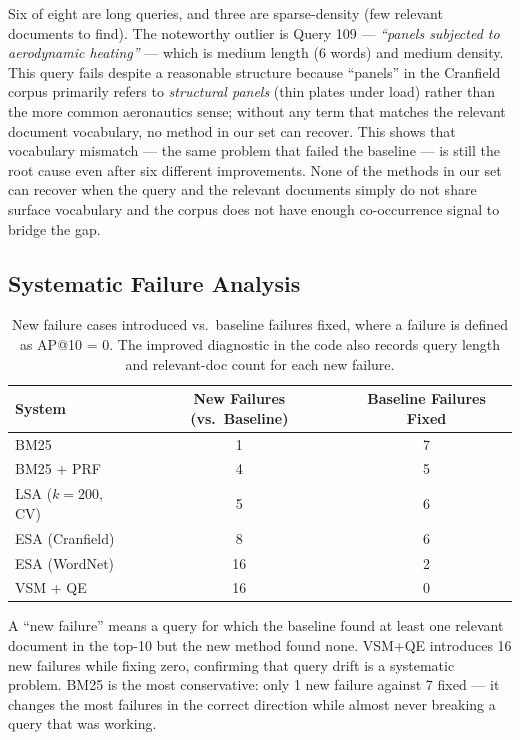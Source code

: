 \documentclass{svproc}
\begin{document}
    Six of eight are long queries, and three are sparse-density (few relevant documents to find). The noteworthy outlier is Query 109 --- \textit{``panels subjected to aerodynamic heating''} --- which is medium length (6 words) and medium density. This query fails despite a reasonable structure because ``panels'' in the Cranfield corpus primarily refers to \emph{structural panels} (thin plates under load) rather than the more common aeronautics sense; without any term that matches the relevant document vocabulary, no method in our set can recover. This shows that vocabulary mismatch --- the same problem that failed the baseline --- is still the root cause even after six different improvements. None of the methods in our set can recover when the query and the relevant documents simply do not share surface vocabulary and the corpus does not have enough co-occurrence signal to bridge the gap.

    \subsection{Systematic Failure Analysis}

    \begin{table}[H]
    \centering
    \renewcommand{\arraystretch}{1.2}
    \begin{tabular}{lcc}
    \toprule
    \textbf{System} & \textbf{New Failures (vs.\ Baseline)} & \textbf{Baseline Failures Fixed} \\
    \midrule
    BM25           & 1  & 7  \\
    BM25 + PRF     & 4  & 5  \\
    LSA ($k{=}200$, CV) & 5  & 6  \\
    ESA (Cranfield)& 8  & 6  \\
    ESA (WordNet)  & 16 & 2  \\
    VSM + QE       & 16 & 0  \\
    \bottomrule
    \end{tabular}
    \caption{New failure cases introduced vs.\ baseline failures fixed, where a failure is defined as AP@10 = 0. The improved diagnostic in the code also records query length and relevant-doc count for each new failure.}
    \end{table}

    A ``new failure'' means a query for which the baseline found at least one relevant document in the top-10 but the new method found none. VSM+QE introduces 16 new failures while fixing zero, confirming that query drift is a systematic problem. BM25 is the most conservative: only 1 new failure against 7 fixed — it changes the most failures in the correct direction while almost never breaking a query that was working.
\end{document}
